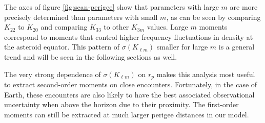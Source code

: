 \documentclass[fleqn,usenatbib]{mnras}
\begin{document}


The axes of figure \ref{fig:scan-perigee} show that parameters with large $m$ are more precisely determined than parameters with small $m$, as can be seen by comparing $K_{22}$ to $K_{20}$ and comparing $K_{33}$ to other $K_{3m}$ values. Large $m$ moments correspond to moments that control higher frequency fluctuations in density at the asteroid equator. This pattern of $\sigma(K_{\ell m})$ smaller for large $m$ is a general trend and will be seen in the following sections as well.

The very strong dependence of $\sigma(K_{\ell m})$ on $r_p$ makes this analysis most useful to extract second-order moments on close encounters. Fortunately, in the case of Earth, these encounters are also likely to have the best associated observational uncertainty when above the horizon due to their proximity. The first-order moments can still be extracted at much larger perigee distances in our model.
\end{document}
